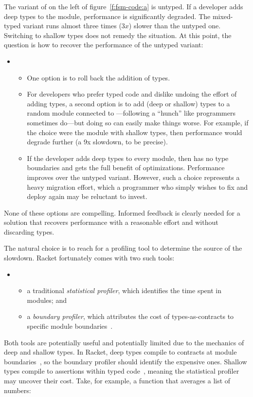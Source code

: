 The variant of  on the left of figure~\ref{f:fsm-code:a} is untyped.
If a developer adds deep types to the  module, performance is
significantly degraded. The mixed-typed variant runs almost three times
($3x$) slower than the untyped one.  Switching to shallow types does not remedy
the situation.
At this point, the question is how to recover the performance of the untyped
variant:
\begin{itemize} \item[] \begin{itemize}
  \item
One option is to roll back the addition of types.
  \item
For developers who prefer typed code and dislike undoing the effort of
adding types, a second option is to add
(deep or shallow) types to a random module connected to ---following a
``hunch'' like programmers sometimes do---but doing so can easily make things
worse. For example, if the choice were the  module with shallow
types, then performance would degrade further (a 9x slowdown, to be
precise).
  \item
If the developer adds deep types to every module, then 
has no type boundaries and gets the full benefit of optimizations. Performance
improves over the untyped variant.
However, such a choice
represents a heavy migration effort, which a programmer who simply
wishes to fix  and deploy again may be reluctant to invest.
\end{itemize} \end{itemize}
None of these options are compelling.
Informed feedback is clearly needed for a solution that recovers performance
with a reasonable effort and without discarding types.

The natural choice is to reach for a
profiling tool to determine the source of the slowdown.
Racket fortunately comes with two such tools: 
\begin{itemize} \item[] \begin{itemize}

\item a traditional \emph{statistical profiler}, which identifies the time spent
 in modules; and

\item a \emph{boundary profiler}, which  attributes the cost of types-as-contracts to
 specific module boundaries~\cite{astavf-feature-prf, staaf-feature-prf}.

\end{itemize} \end{itemize}
Both tools are potentially useful and potentially limited due to the mechanics
of deep and shallow types.
In Racket, deep types compile to contracts at module
boundaries~\cite{tf-popl-2008}, so the boundary profiler should identify the
expensive ones.  Shallow types compile to assertions within typed
code~\cite{glfd-pj-2022}, meaning the statistical profiler may uncover their
cost.
Take, for example, a function that averages a list of numbers:

